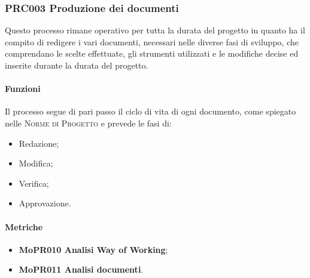 \documentclass[../piano-di-qualifica.tex]{subfiles}
\begin{document}
\subsubsection{PRC003 Produzione dei documenti}
\label{sub:produzione_dei_documenti}
Questo processo rimane operativo per tutta la durata del progetto in quanto ha il compito di redigere i vari documenti, necessari nelle diverse fasi di sviluppo, che comprendano le scelte effettuate, gli strumenti utilizzati e le modifiche decise ed inserite durante la durata del progetto.

\paragraph{Funzioni}
\label{sub:funzioni_3}
Il processo segue di pari passo il ciclo di vita di ogni documento, come spiegato nelle \textsc{Norme di Progetto} e prevede le fasi di:
\begin{itemize}
    \item Redazione;
    \item Modifica;
    \item Verifica;
    \item Approvazione.        
\end{itemize}

\paragraph{Metriche}
\label{sub:metriche_3}
\begin{itemize}
    \item \textbf{MoPR010 Analisi Way of Working};
    \item \textbf{MoPR011 Analisi documenti}.
\end{itemize}
\end{document}
